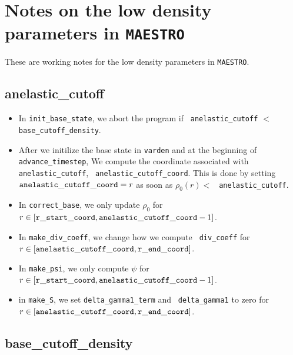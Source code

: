 \section{Notes on the low density parameters in {\tt MAESTRO}}

These are working notes for the low density parameters in {\tt MAESTRO}.

\subsection{anelastic\_cutoff}

\begin{itemize}

\item In {\tt init\_base\_state}, we abort the program if {\tt
  anelastic\_cutoff} $<$ {\tt base\_cutoff\_density}.

\item After we initilize the base state in {\tt varden} and at the
  beginning of {\tt advance\_timestep}, We compute the coordinate
  associated with {\tt anelastic\_cutoff}, {\tt
    anelastic\_cutoff\_coord}.  This is done by setting ${\tt
    anelastic\_cutoff\_coord}= r$ as soon as $\rho_0(r) <$ {\tt
    anelastic\_cutoff}.

\item In {\tt correct\_base}, we only update $\rho_0$ for $r\in[{\tt
    r\_start\_coord},{\tt anelastic\_cutoff\_coord}-1]$.

\item In {\tt make\_div\_coeff}, we change how we compute {\tt
  div\_coeff} for $r\in[{\tt anelastic\_cutoff\_coord},{\tt
    r\_end\_coord}]$.

\item In {\tt make\_psi}, we only compute $\psi$ for $r\in[{\tt
    r\_start\_coord},{\tt anelastic\_cutoff\_coord}-1]$.

\item in {\tt make\_S}, we set {\tt delta\_gamma1\_term} and {\tt
  delta\_gamma1} to zero for $r\in[{\tt anelastic\_cutoff\_coord},{\tt
    r\_end\_coord}]$.
\end{itemize}

\subsection{base\_cutoff\_density}

